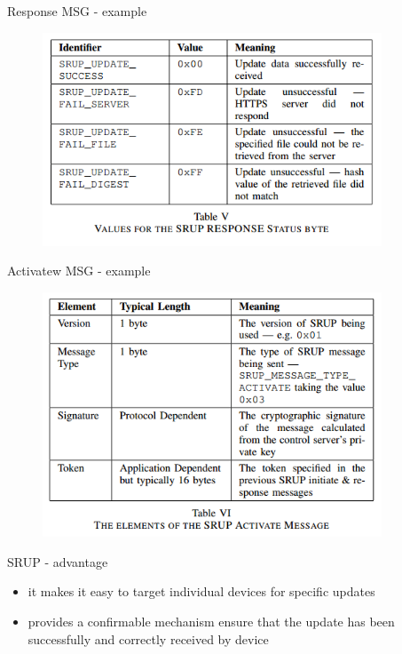 \documentclass{beamer}
\begin{document}
\begin{frame}{Response MSG - example}
    \begin{figure}[t]
        \centering
        \includegraphics[width=0.9\textwidth]{figures/table5.png}
    \end{figure}
\end{frame}


\begin{frame}{Activatew MSG - example}
    \begin{figure}[t]
        \centering
        \includegraphics[width=0.9\textwidth]{figures/table6.png}
    \end{figure}
\end{frame}

\begin{frame}{SRUP - advantage}
    \begin{itemize}
        \item{it makes it easy to target individual devices for specific updates}
        \item{provides a confirmable mechanism ensure that the update has been successfully and correctly received by device}
    \end{itemize}
\end{frame}
\end{document}
